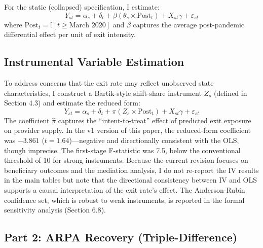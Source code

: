 \documentclass[12pt]{article}
\newcommand{\ind}{\mathbb{I}}
\begin{document}
For the static (collapsed) specification, I estimate:
\begin{equation}
Y_{st} = \alpha_s + \delta_t + \beta \left( \theta_s \times \text{Post}_{t} \right) + X_{st} \gamma + \varepsilon_{st}
\label{eq:did}
\end{equation}
where $\text{Post}_t = \ind[t \geq \text{March 2020}]$ and $\beta$ captures the average post-pandemic differential effect per unit of exit intensity.

\subsection{Instrumental Variable Estimation}

To address concerns that the exit rate may reflect unobserved state characteristics, I construct a Bartik-style shift-share instrument $Z_s$ (defined in Section 4.3) and estimate the reduced form:
\begin{equation}
Y_{st} = \alpha_s + \delta_t + \pi \left( Z_s \times \text{Post}_{t} \right) + X_{st} \gamma + \varepsilon_{st}
\end{equation}
The coefficient $\hat{\pi}$ captures the ``intent-to-treat'' effect of predicted exit exposure on provider supply. In the v1 version of this paper, the reduced-form coefficient was $-3.861$ ($t = 1.64$)---negative and directionally consistent with the OLS, though imprecise. The first-stage F-statistic was 7.5, below the conventional threshold of 10 for strong instruments. Because the current revision focuses on beneficiary outcomes and the mediation analysis, I do not re-report the IV results in the main tables but note that the directional consistency between IV and OLS supports a causal interpretation of the exit rate's effect. The Anderson-Rubin confidence set, which is robust to weak instruments, is reported in the formal sensitivity analysis (Section 6.8).

\subsection{Part 2: ARPA Recovery (Triple-Difference)}
\end{document}

